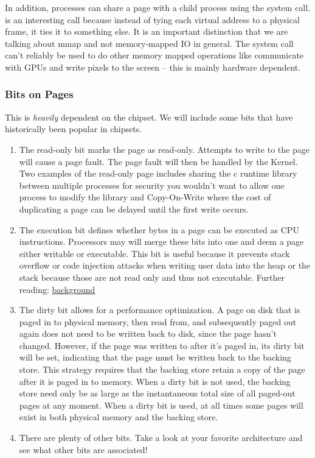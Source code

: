 In addition, processes can share a page with a child process using the  system call.
 is an interesting call because instead of tying each virtual address to a physical frame, it ties it to something else. It is an important distinction that we are talking about mmap and not memory-mapped IO in general. The  system call can't reliably be used to do other memory mapped operations like communicate with GPUs and write pixels to the screen -- this is mainly hardware dependent.

\subsubsection{Bits on Pages}

This is \textit{heavily} dependent on the chipset.
We will include some bits that have historically been popular in chipsets.

\begin{enumerate}
\item The read-only bit marks the page as read-only.
Attempts to write to the page will cause a page fault.
The page fault will then be handled by the Kernel.
Two examples of the read-only page includes sharing the c runtime library between multiple processes for security you wouldn't want to allow one process to modify the library and Copy-On-Write where the cost of duplicating a page can be delayed until the first write occurs.

\item The execution bit defines whether bytes in a page can be executed as CPU instructions.
Processors may will merge these bits into one and deem a page either writable or executable.
This bit is useful because it prevents stack overflow or code injection attacks when writing user data into the heap or the stack because those are not read only and thus not executable.
Further reading: \href{http://en.wikipedia.org/wiki/NX\_bit\#Hardware\_background}{background}

\item The dirty bit allows for a performance optimization.
A page on disk that is paged in to physical memory, then read from, and subsequently paged out again does not need to be written back to disk, since the page hasn't changed.
However, if the page was written to after it's paged in, its dirty bit will be set, indicating that the page must be written back to the backing store.
This strategy requires that the backing store retain a copy of the page after it is paged in to memory.
When a dirty bit is not used, the backing store need only be as large as the instantaneous total size of all paged-out pages at any moment.
When a dirty bit is used, at all times some pages will exist in both physical memory and the backing store.
\item There are plenty of other bits. Take a look at your favorite architecture and see what other bits are associated!
\end{enumerate}

